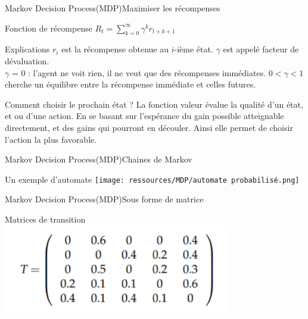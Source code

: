 \begin{frame}{Markov Decision Process(MDP)}{Maximiser les récompenses}
	\begin{center}
		
		\begin{block}{Fonction de récompense}
            \centering
			$R_t = \sum^{\infty}_{k=0}\gamma^{k}r_{t+k+1}$
		\end{block}
		\begin{block}{Explications}
			$r_{i}$ est la récompense obtenue au $i$-ième état.
			$\gamma$ est appelé facteur de dévaluation.\\
			$\gamma$ = 0 : l'agent ne voit rien, il ne veut que des récompenses immédiates.
			$0< \gamma <1$ cherche un équilibre entre la récompense immédiate et celles futures.
		\end{block}
		\begin{block}{Comment choisir le prochain état ?}
			La fonction valeur évalue la qualité d’un état, et ou d’une action. En se basant sur l’espérance du gain possible atteignable directement, et des gains qui pourront en découler. Ainsi elle permet de choisir l’action la plus favorable.
		\end{block}
	\end{center}
\end{frame}
\begin{frame}{Markov Decision Process(MDP)}{Chaines de Markov}
	\begin{center}
		
		\begin{center}{Un exemple d'automate}
			\texttt{[image: ressources/MDP/automate probabilisé.png]}
		\end{center}
	\end{center}
\end{frame}
\begin{frame}{Markov Decision Process(MDP)}{Sous forme de matrice}
	\begin{center}
		\begin{center}{Matrices de transition}
			\includegraphics[width=10cm]{ressources/MDP/Matrice de transitions.png}
		\end{center}
	\end{center}
\end{frame}
